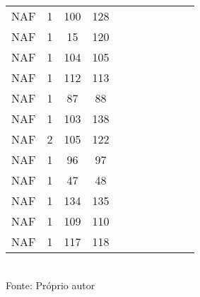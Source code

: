\begin{table}[H]
{\begin{tabular}{ccccccccccc}
NAF & 1 & 100 & 128 &  &  &  &  &  &  &  \\
NAF & 1 & 15 & 120 &  &  &  &  &  &  &  \\
NAF & 1 & 104 & 105 &  &  &  &  &  &  &  \\
NAF & 1 & 112 & 113 &  &  &  &  &  &  &  \\
NAF & 1 & 87 & 88 &  &  &  &  &  &  &  \\
NAF & 1 & 103 & 138 &  &  &  &  &  &  &  \\
NAF & 2 & 105 & 122 &  &  &  &  &  &  &  \\
NAF & 1 & 96 & 97 &  &  &  &  &  &  &  \\
NAF & 1 & 47 & 48 &  &  &  &  &  &  &  \\
NAF & 1 & 134 & 135 &  &  &  &  &  &  &  \\
NAF & 1 & 109 & 110 &  &  &  &  &  &  &  \\
NAF & 1 & 117 & 118 &  &  &  &  &  &  &  \\
\bottomrule
\end{tabular}}
\\Fonte: Próprio autor
\end{table}


